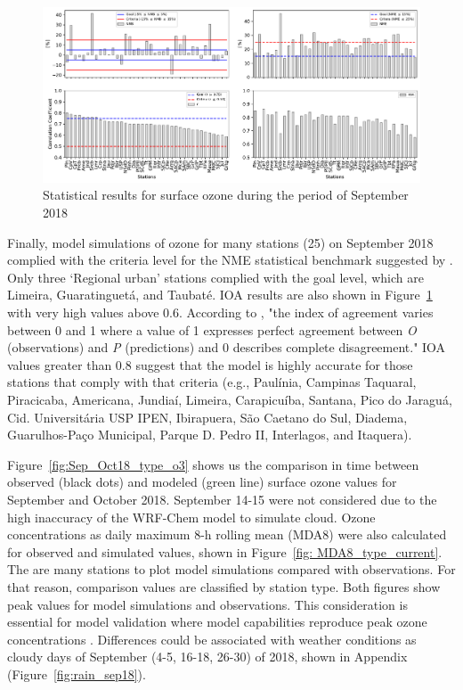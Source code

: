 \begin{figure}[!ht]
\begin{center}
    \includegraphics[width=1\textwidth]{fig/o3_stats_sep18.pdf}
\end{center}
  \caption{Statistical results for surface ozone during the period of September 2018}
  \label{fig: o3_stats}
\end{figure}

  Finally, model simulations of ozone for many stations (25) on September 2018 complied with the criteria level for the NME statistical benchmark suggested by \citet{Emery2017}. Only three `Regional urban' stations complied with the goal level, which are Limeira, Guaratinguet\'{a}, and Taubat\'{e}.
  IOA results are also shown in Figure~\ref{fig: o3_stats} with very high values above 0.6.
  According to \citet{Willmott1984}, "the index of agreement varies between 0 and 1 where a value of 1 expresses perfect agreement between \textit{O} (observations) and \textit{P} (predictions) and 0 describes complete disagreement."
  IOA values greater than 0.8 suggest that the model is highly accurate for those stations that comply with that criteria (e.g., Paul\'{i}nia,  Campinas Taquaral, Piracicaba, Americana, Jundia\'{i}, Limeira, Carapicu\'{i}ba, Santana, Pico do Jaragu\'{a}, Cid. Universit\'{a}ria USP IPEN, Ibirapuera, S\~{a}o Caetano do Sul, Diadema, Guarulhos-Pa\c{c}o Municipal, Parque D. Pedro II, Interlagos, and Itaquera).

Figure~\ref{fig:Sep_Oct18_type_o3} shows us the comparison in time between observed (black dots) and modeled (green line) surface ozone values for September and October 2018.
September 14-15 were not considered due to the high inaccuracy of the WRF-Chem model to simulate cloud.   
Ozone concentrations as daily maximum 8-h rolling mean (MDA8) were also calculated for observed and simulated values, shown in Figure~\ref{fig: MDA8_type_current}.
The are many stations to plot model simulations compared with observations.
For that reason, comparison values are classified by station type.
Both figures show peak values for model simulations and observations.
This consideration is essential for model validation where model capabilities reproduce peak ozone concentrations \citep{Seinfeld2016}.
Differences could be associated with weather conditions as cloudy days of September (4-5, 16-18, 26-30) of 2018, shown in Appendix (Figure~\ref{fig:rain_sep18}).

